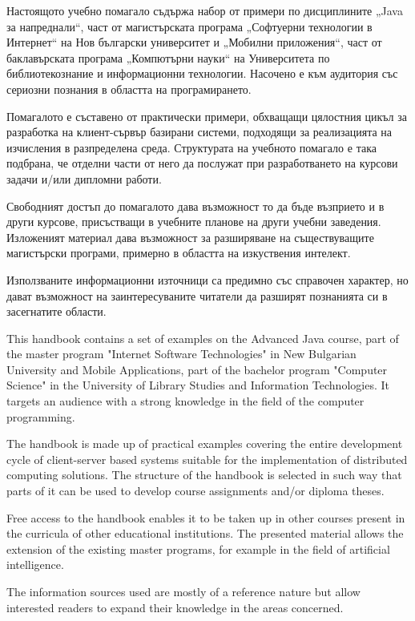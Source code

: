 Настоящото учебно помагало съдържа набор от примери по дисциплините „Java за напреднали“, част от магистърската програма „Софтуерни технологии в Интернет“ на Нов български университет и „Мобилни приложения“, част от баклавърската програма „Компютърни науки“ на Университета по библиотекознание и информационни технологии. Насочено е към аудитория със сериозни познания в областта на програмирането. 

Помагалото е съставено от практически примери, обхващащи цялостния цикъл за разработка на клиент-сървър базирани системи, подходящи за реализацията на изчисления в разпределена среда. Структурата на учебното помагало е така подбрана, че отделни части от него да послужат при разработването на курсови задачи и/или дипломни работи.

Свободният достъп до помагалото дава възможност то да бъде възприето и в други курсове, присъстващи в учебните планове на други учебни заведения. Изложеният материал дава възможност за разширяване на съществуващите магистърски програми, примерно в областта на изкуствения интелект.

Използваните информационни източници са предимно със справочен характер, но дават възможност на заинтересуваните читатели да разширят познанията си в засегнатите области. 

This handbook contains a set of examples on the Advanced Java course, part of the master program "Internet Software Technologies" in New Bulgarian University and Mobile Applications, part of the bachelor program "Computer Science" in the University of Library Studies and Information Technologies. It targets an audience with a strong knowledge in the field of the computer programming.

The handbook is made up of practical examples covering the entire development cycle of client-server based systems suitable for the implementation of distributed computing solutions. The structure of the handbook is selected in such way that parts of it can be used to develop course assignments and/or diploma theses.

Free access to the handbook enables it to be taken up in other courses present in the curricula of other educational institutions. The presented material allows the extension of the existing master programs, for example in the field of artificial intelligence.

The information sources used are mostly of a reference nature but allow interested readers to expand their knowledge in the areas concerned.

